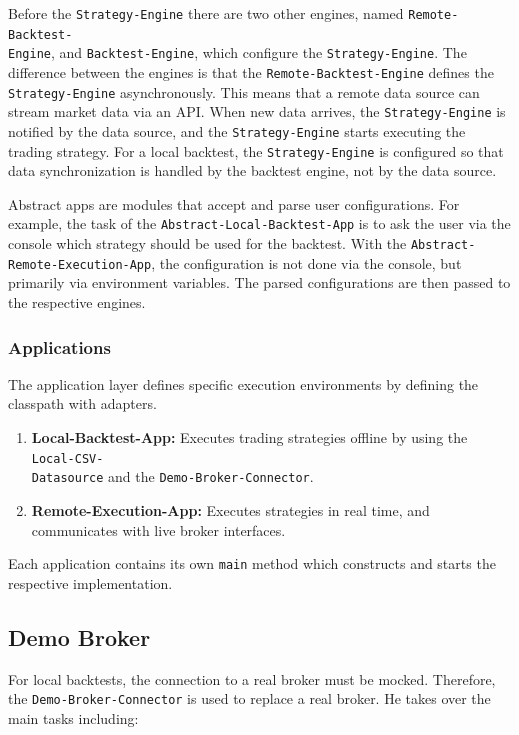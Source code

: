 \noindent
Before the \texttt{Strategy-Engine} there are two other engines, named \texttt{Remote-Backtest-}\\\texttt{Engine}, and \texttt{Backtest-Engine}, which configure the \texttt{Strategy-Engine}.
The difference between the engines is that the \texttt{Remote-Backtest-Engine} defines the \texttt{Strategy-Engine} asynchronously.
This means that a remote data source can stream market data via an API.
When new data arrives, the \texttt{Strategy-Engine} is notified by the data source, and the \texttt{Strategy-Engine} starts executing the trading strategy.
For a local backtest, the \texttt{Strategy-Engine} is configured so that data synchronization is handled by the backtest engine, not by the data source.

Abstract apps are modules that accept and parse user configurations.
For example, the task of the \texttt{Abstract-Local-Backtest-App} is to ask the user via the console which strategy should be used for the backtest.
With the \texttt{Abstract-Remote-Execution-App}, the configuration is not done via the console, but primarily via environment variables.
The parsed configurations are then passed to the respective engines.

\subsubsection{Applications}

The application layer defines specific execution environments by defining the classpath with adapters.

\begin{enumerate}
    \item \textbf{Local-Backtest-App:} Executes trading strategies offline by using the \texttt{Local-CSV-}\\\texttt{Datasource} and the \texttt{Demo-Broker-Connector}.
    \item \textbf{Remote-Execution-App:} Executes strategies in real time, and communicates with live broker interfaces.
\end{enumerate}

\noindent
Each application contains its own \texttt{main} method which constructs and starts the respective implementation.

\subsection{Demo Broker}

For local backtests, the connection to a real broker must be mocked.
Therefore, the \texttt{Demo-Broker-Connector} is used to replace a real broker.
He takes over the main tasks including:

